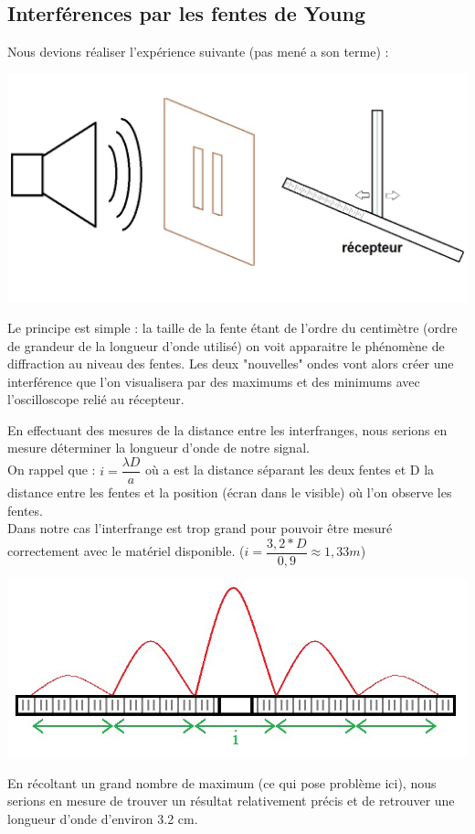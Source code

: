\documentclass[12pt,a4paper]{article}
\begin{document}
	\subsection{Interférences par les fentes de Young}
	Nous devions réaliser l'expérience suivante (pas mené a son terme) :
	\begin{multicols}{2}
		\includegraphics[scale=0.28]{schem2} 
		\columnbreak
		
		Le principe est simple : la taille de la fente étant de l'ordre du centimètre (ordre de grandeur de la longueur d'onde utilisé) on voit apparaitre le phénomène de diffraction au niveau des fentes. Les deux "nouvelles" ondes vont alors créer une interférence que l'on visualisera par des maximums et des minimums avec l'oscilloscope relié au récepteur. 
	\end{multicols}
	En effectuant des mesures de la distance entre les interfranges, nous serions en mesure déterminer la longueur d'onde de notre signal.\\
	On rappel  que : $i=\dfrac{\lambda D}{a}$ où a est la distance séparant les deux fentes et D la distance entre les fentes et la position (écran dans le visible) où l'on observe les fentes.\\
	Dans notre cas l'interfrange est trop grand pour pouvoir être mesuré correctement avec le matériel disponible. ($i=\dfrac{3,2*D}{0,9}\approx1,33m$)
	\begin{center}
		\includegraphics[scale=0.6]{schem3} 
	\end{center}
	En récoltant un grand nombre de maximum (ce qui pose problème ici), nous serions en mesure de trouver un résultat relativement précis et de retrouver une longueur d'onde d'environ 3.2 cm.
\end{document}
